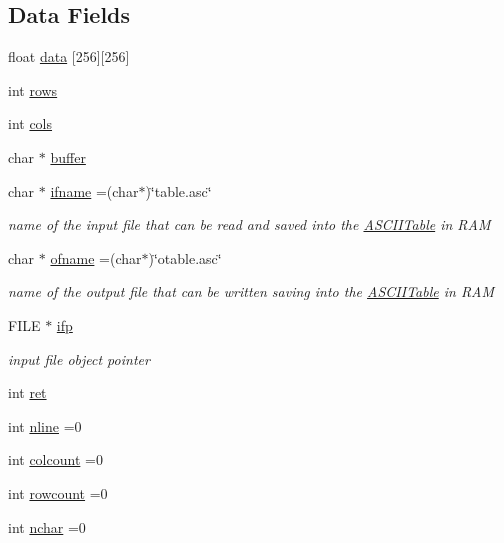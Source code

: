 \subsection*{Data Fields}
\begin{DoxyCompactItemize}
\item 
float \hyperlink{classASCIITable_a638c2dc7e076f756226ae733beadc5e4}{data} \mbox{[}256\mbox{]}\mbox{[}256\mbox{]}
\item 
int \hyperlink{classASCIITable_ac05ef89d192bd866ba035674b721cb52}{rows}
\item 
int \hyperlink{classASCIITable_a43631791bb496f2a4d7434f7f58366e5}{cols}
\item 
char $\ast$ \hyperlink{classASCIITable_a4207703c6053463369e7b735d2acade4}{buffer}
\item 
char $\ast$ \hyperlink{classASCIITable_a4a4851a1a4e225724a0eb1cd6d1d143f}{ifname} =(char$\ast$)\char`\"{}table.\+asc\char`\"{}
\begin{DoxyCompactList}\small\item\em name of the input file that can be read and saved into the \hyperlink{classASCIITable}{A\+S\+C\+I\+I\+Table} in R\+AM \end{DoxyCompactList}\item 
char $\ast$ \hyperlink{classASCIITable_aefc70f3b1a4e713388c5d8232174ea19}{ofname} =(char$\ast$)\char`\"{}otable.\+asc\char`\"{}
\begin{DoxyCompactList}\small\item\em name of the output file that can be written saving into the \hyperlink{classASCIITable}{A\+S\+C\+I\+I\+Table} in R\+AM \end{DoxyCompactList}\item 
F\+I\+LE $\ast$ \hyperlink{classASCIITable_ae9f8a8aad63faf17676240fd8dee6ae6}{ifp}
\begin{DoxyCompactList}\small\item\em input file object pointer \end{DoxyCompactList}\item 
int \hyperlink{classASCIITable_aae50bf12dfec6330e08a2a77b8a11146}{ret}
\item 
int \hyperlink{classASCIITable_ac87f7ae9bbb1a3c73b7717c5b134bd0c}{nline} =0
\item 
int \hyperlink{classASCIITable_aed90c714b9dc45b356e26bf4d02af1a2}{colcount} =0
\item 
int \hyperlink{classASCIITable_adc342ae85d1b6ad8b5cdfbda85176a70}{rowcount} =0
\item 
int \hyperlink{classASCIITable_a5c16e8d47c74cafec9d906d63e471126}{nchar} =0

\end{DoxyCompactItemize}
